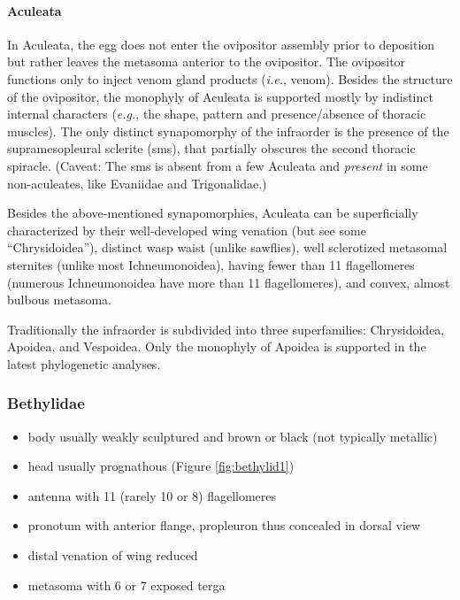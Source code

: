 \documentclass[letterpaper, 11pt]{article}
\begin{document}
\paragraph*{Aculeata} In Aculeata, the egg does not enter the ovipositor assembly prior to deposition but rather leaves the metasoma anterior to the ovipositor. The ovipositor functions only to inject venom gland products (\textit{i.e.}, venom). Besides the structure of the ovipositor, the monophyly of Aculeata is supported mostly by indistinct internal characters (\textit{e.g.}, the shape, pattern and presence/absence of thoracic muscles). The only distinct synapomorphy of the infraorder is the presence of the supramesopleural sclerite (sms), that partially obscures the second thoracic spiracle. (Caveat: The sms is absent from a few Aculeata and \textit{present} in some non-aculeates, like Evaniidae and Trigonalidae.)

Besides the above-mentioned synapomorphies, Aculeata can be superficially characterized by their well-developed wing venation (but see some ``Chrysidoidea''), distinct wasp waist (unlike sawflies), well sclerotized metasomal sternites (unlike most Ichneumonoidea), having fewer than 11 flagellomeres (numerous Ichneumonoidea have more than 11 flagellomeres), and convex, almost bulbous metasoma.

Traditionally the infraorder is subdivided into three superfamilies: Chrysidoidea, Apoidea, and Vespoidea. Only the monophyly of Apoidea is supported in the latest phylogenetic analyses.

\subsubsection{Bethylidae}
\begin{itemize}
\item body usually weakly sculptured and brown or black (not typically metallic)
\item head usually prognathous (Figure \ref{fig:bethylid1})
\item antenna with 11 (rarely 10 or 8) flagellomeres
\item pronotum with anterior flange, propleuron thus concealed in dorsal view 
\item distal venation of wing reduced
\item metasoma with 6 or 7 exposed terga
\end{itemize}
\end{document}
